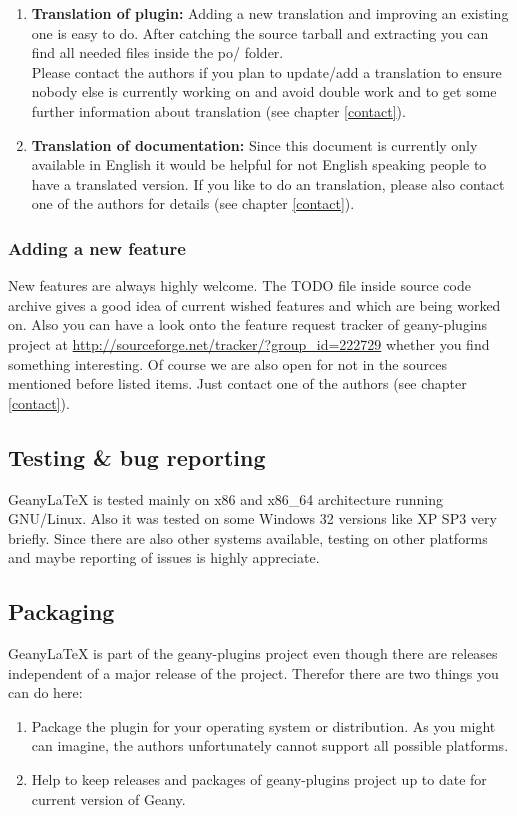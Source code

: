 \documentclass[%
a4paper,%
10pt,%
oneside,%
DIV18,
headsepline,
plainheadsepline,
footsepline,
plainfootsepline,
bibtotoc,%
liststotoc,%
BCOR12mm,%
halfparskip,%
openany,%
]{scrartcl}
\begin{document}
\begin{enumerate}
\item \textbf{Translation of plugin:}
	   Adding a new translation and improving an existing one is easy to
	   do. After catching the source tarball and extracting you can find
	   all needed files inside the po/ folder. \\
	   Please contact the authors if you plan to update/add a translation
	   to ensure nobody else is currently working on and avoid double
	   work and to get some further information about translation (see
	   chapter \ref{contact}).
\item \textbf{Translation of documentation:}
	   Since this document is currently only available in English it
	   would be helpful for not English speaking people to have a
	   translated version. If you like to do an translation, please
	   also contact one of the authors for details (see chapter \ref{contact}).
\end{enumerate}

\subsubsection{Adding a new feature}
New features are always highly welcome. The TODO file inside source
code archive gives a good idea of current wished features and which
are being worked on. Also you can have a look onto the feature request
tracker of geany-plugins project at
\url{http://sourceforge.net/tracker/?group\_id=222729} whether you find
something interesting. Of course we are also open for not in the
sources mentioned before listed items. Just contact one of the authors
(see chapter \ref{contact}).

\subsection{Testing \& bug reporting} Geany\LaTeX{} is tested mainly
on x86 and x86\_64 architecture running GNU/Linux. Also it was
tested on some Windows 32 versions like XP SP3 very briefly. Since
there are also other systems available, testing on other platforms
and maybe reporting of issues is highly appreciate.

\subsection{Packaging}
Geany\LaTeX{} is part of the geany-plugins project even though there
are releases independent of a major release of the project. Therefor
there are two things you can do here:
\begin{enumerate}
	\item Package the plugin for your operating system or
	distribution. As you might can imagine, the authors unfortunately
	cannot support all possible platforms.
	\item Help to keep releases and packages of geany-plugins project
	up to date for current version of Geany.
\end{enumerate}
\end{document}
